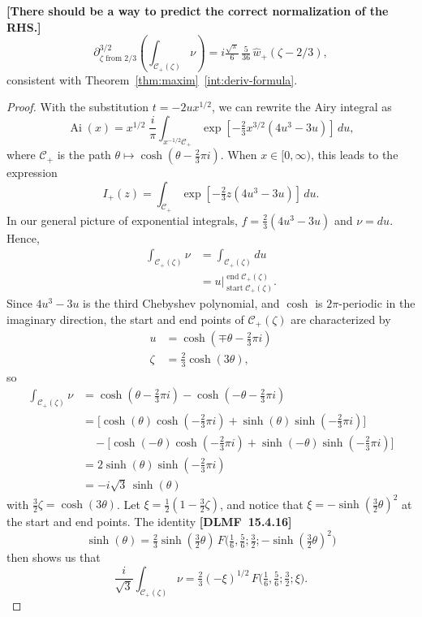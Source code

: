 \documentclass[11pt,a4paper,twoside,leqno,noamsfonts]{amsart}
\numberwithin{equation}{section}
\DeclareMathOperator{\Ai}{Ai}
\begin{document}
\begin{example}[Airy]
\begin{claim}\label{claim 2}
\textbf{[There should be a way to predict the correct normalization of the RHS.]}
\[ \partial^{3/2}_{\zeta \text{ from } 2/3} \left( \int_{\mathcal{C}_+(\zeta)} \nu \right) = i \tfrac{\sqrt{\pi}}{6}\,\tfrac{5}{36}\,\hat{w}_+(\zeta-2/3), \]
consistent with Theorem~\ref{thm:maxim}~\eqref{int:deriv-formula}.
\end{claim}
\begin{proof}
With the substitution $t = -2ux^{1/2}$, we can rewrite the Airy integral as
\[ \Ai(x) = x^{1/2}\;\frac{i}{\pi} \int_{x^{-1/2} \mathcal{C}_+} \exp\left[-\tfrac{2}{3}x^{3/2} \left(4u^3 - 3u\right)\right]\,du, \]
where $\mathcal{C}_+$ is the path $\theta \mapsto \cosh(\theta - \tfrac{2}{3}\pi i)$. When $x \in [0, \infty)$, this leads to the expression
\[ I_+(z) = \int_{\mathcal{C}_+} \exp\left[-\tfrac{2}{3} z \left(4u^3 - 3u\right)\right]\,du. \]
In our general picture of exponential integrals, $f = \tfrac{2}{3}(4u^3 - 3u)$ and $\nu = du$. Hence,
\begin{align*}
\int_{\mathcal{C}_+(\zeta)} \nu & = \int_{\mathcal{C}_+(\zeta)} du \\
& = u \Big|_{\operatorname{start} \mathcal{C}_+(\zeta)}^{\operatorname{end} \mathcal{C}_+(\zeta)}.
\end{align*}
Since $4u^3 - 3u$ is the third Chebyshev polynomial, and $\cosh$ is $2\pi$-periodic in the imaginary direction, the start and end points of $\mathcal{C}_+(\zeta)$ are characterized by
\begin{align*}
u & = \cosh(\mp\theta - \tfrac{2}{3}\pi i) \\
\zeta & = \tfrac{2}{3} \cosh(3\theta),
\end{align*}
so
\begin{align*}
\int_{\mathcal{C}_+(\zeta)} \nu & = \cosh(\theta - \tfrac{2}{3}\pi i) - \cosh(-\theta - \tfrac{2}{3}\pi i) \\
& = \big[\cosh(\theta) \cosh(-\tfrac{2}{3}\pi i) + \sinh(\theta) \sinh(-\tfrac{2}{3}\pi i)\big] \\
& \quad - \big[\cosh(-\theta) \cosh(-\tfrac{2}{3}\pi i) + \sinh(-\theta) \sinh(-\tfrac{2}{3}\pi i)\big] \\
& = 2\sinh(\theta) \sinh(-\tfrac{2}{3}\pi i) \\
& = -i\sqrt{3}\,\sinh(\theta)
\end{align*}
with $\tfrac{3}{2} \zeta = \cosh(3\theta)$. Let $\xi = \tfrac{1}{2}(1 - \tfrac{3}{2}\zeta)$, and notice that $\xi = -\sinh(\tfrac{3}{2} \theta)^2$ at the start and end points. The identity \textbf{[DLMF~15.4.16]}
\[ \sinh(\theta) = \tfrac{2}{3} \sinh(\tfrac{3}{2} \theta)\,F\big(\tfrac{1}{6}, \tfrac{5}{6}; \tfrac{3}{2}; -\sinh(\tfrac{3}{2} \theta)^2\big) \]
then shows us that
\[ \frac{i}{\sqrt{3}} \int_{\mathcal{C}_+(\zeta)} \nu = \tfrac{2}{3} (-\xi)^{1/2}\,F\big(\tfrac{1}{6}, \tfrac{5}{6}; \tfrac{3}{2}; \xi\big). \]


\end{proof}
\end{example}
\end{document}
